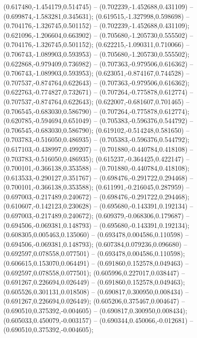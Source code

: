  (0.617480,-1.454179,0.514745) -- (0.702239,-1.452688,0.431109) -- (0.699874,-1.583281,0.345631);
 (0.619515,-1.327998,0.598698) -- (0.704176,-1.326745,0.501152) -- (0.702239,-1.452688,0.431109);
 (0.621096,-1.206604,0.663902) -- (0.705680,-1.205730,0.555502) -- (0.704176,-1.326745,0.501152);
 (0.622215,-1.090311,0.710066) -- (0.706743,-1.089903,0.593953) -- (0.705680,-1.205730,0.555502);
 (0.622868,-0.979409,0.736982) -- (0.707363,-0.979506,0.616362) -- (0.706743,-1.089903,0.593953);
 (0.623051,-0.874167,0.744528) -- (0.707537,-0.874764,0.622643) -- (0.707363,-0.979506,0.616362);
 (0.622763,-0.774827,0.732671) -- (0.707264,-0.775878,0.612774) -- (0.707537,-0.874764,0.622643);
 (0.622007,-0.681607,0.701465) -- (0.706545,-0.683030,0.586790) -- (0.707264,-0.775878,0.612774);
 (0.620785,-0.594694,0.651049) -- (0.705383,-0.596376,0.544792) -- (0.706545,-0.683030,0.586790);
 (0.619102,-0.514248,0.581650) -- (0.703783,-0.516050,0.486935) -- (0.705383,-0.596376,0.544792);
 (0.617103,-0.438997,0.499207) -- (0.701880,-0.440784,0.418108) -- (0.703783,-0.516050,0.486935);
 (0.615237,-0.364425,0.422147) -- (0.700101,-0.366138,0.353588) -- (0.701880,-0.440784,0.418108);
 (0.613533,-0.290127,0.351767) -- (0.698476,-0.291722,0.294468) -- (0.700101,-0.366138,0.353588);
 (0.611991,-0.216045,0.287959) -- (0.697003,-0.217489,0.240672) -- (0.698476,-0.291722,0.294468);
 (0.610607,-0.142123,0.230628) -- (0.695680,-0.143391,0.192134) -- (0.697003,-0.217489,0.240672);
 (0.609379,-0.068306,0.179687) -- (0.694506,-0.069381,0.148793) -- (0.695680,-0.143391,0.192134);
 (0.608305,0.005463,0.135060) -- (0.693478,0.004586,0.110598) -- (0.694506,-0.069381,0.148793);
 (0.607384,0.079236,0.096680) -- (0.692597,0.078558,0.077501) -- (0.693478,0.004586,0.110598);
 (0.606615,0.153070,0.064491) -- (0.691860,0.152578,0.049463) -- (0.692597,0.078558,0.077501);
 (0.605996,0.227017,0.038447) -- (0.691267,0.226694,0.026449) -- (0.691860,0.152578,0.049463);
 (0.605526,0.301131,0.018508) -- (0.690817,0.300950,0.008434) -- (0.691267,0.226694,0.026449);
 (0.605206,0.375467,0.004647) -- (0.690510,0.375392,-0.004605) -- (0.690817,0.300950,0.008434);
 (0.605033,0.450079,-0.003157) -- (0.690344,0.450066,-0.012681) -- (0.690510,0.375392,-0.004605);
